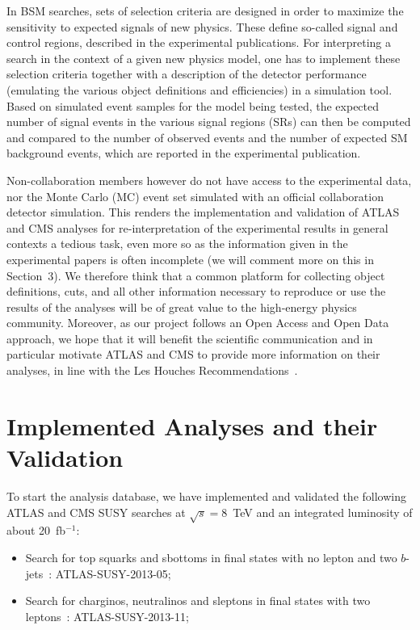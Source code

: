 In BSM searches, sets of selection criteria are designed in order to maximize the sensitivity to expected signals of new physics. These define so-called signal and control regions, described in the experimental publications. 
For interpreting a search in the context of a given new physics model, one has to implement these selection criteria together with a description of the detector performance (emulating the various object definitions and efficiencies) in a simulation tool. 
Based on simulated event samples for the model being tested,  the expected number of signal events  in the various signal regions (SRs) can then be computed and compared to the number of observed events and the number of expected SM background events, which are reported in the experimental publication.  

Non-collaboration members however do not have access to the experimental data, nor the Monte Carlo (MC) event set 
simulated with an official collaboration detector simulation. This renders the implementation and validation 
of ATLAS and CMS analyses for re-interpretation of the experimental results in general contexts 
a tedious task, even more so as the information given in the experimental papers is often incomplete (we will comment more on this in Section~3).  
We therefore think that a common platform for collecting object definitions, cuts, and all other information 
necessary to reproduce or use the results of the analyses will be of great value to the high-energy physics community.  
Moreover, as our project follows an Open Access and Open Data approach, we hope that it will benefit the 
scientific communication and in particular motivate ATLAS and CMS to provide more information 
on their analyses, in line with the Les Houches Recommendations~\cite{Kraml:2012sg}.



\section{Implemented Analyses and their Validation}\label{sec:implemended}


To start the analysis database, we have implemented and validated the following ATLAS and CMS SUSY 
searches at $\sqrt{s}=8$~TeV and an integrated luminosity of about 20~fb$^{-1}$: \\

\begin{itemize}
\item Search for top squarks and sbottoms in final states with no lepton and two $b$-jets~\cite{MA5-ATLAS-SUSY-2013-05}: ATLAS-SUSY-2013-05;\\
\item Search for charginos, neutralinos and sleptons in final states with two leptons~\cite{MA5-ATLAS-SUSY-2013-11}: ATLAS-SUSY-2013-11;\\
\end{itemize}

